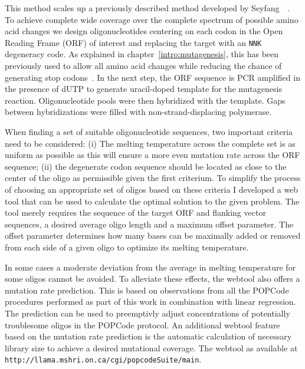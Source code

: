 This method scales up a previously described method developed by Seyfang~\etal~\cite{seyfang_multiple_2004}. To achieve complete wide coverage over the complete spectrum of possible amino acid changes we design oligonucleotides centering on each codon in the Open Reading Frame (ORF) of interest and replacing the target with an \texttt{NNK} degeneracy code. As explained in chapter~\ref{intro:mutagenesis}, this has been previously used to allow all amino acid changes while reducing the chance of generating stop codons~\cite{pal_methods_2005}. 
In the next step, the ORF sequence is PCR amplified in the presence of dUTP to generate uracil-doped template for the mutagenesis reaction. Oligonucleotide pools were then hybridized with the template. Gaps between hybridizations were filled with non-strand-displacing polymerase. 

When finding a set of suitable oligonucleotide sequences, two important criteria need to be considered: 
(i) The melting temperature across the complete set is as uniform as possible as this will ensure a more even mutation rate across the ORF sequence; (ii) the degenerate codon sequence should be located as close to the center of the oligo as permissible given the first criterium. To simplify the process of choosing an appropriate set of oligos based on these criteria I developed a web tool that can be used to calculate the optimal solution to the given problem. The tool merely requires the sequence of the target ORF and flanking vector sequences, a desired average oligo length and a maximum offset parameter. The offset parameter determines how many bases can be maximally added or removed from each side of a given oligo to optimize its melting temperature. 

In some cases a moderate deviation from the average in melting temperature for some oligos cannot be avoided. To alleviate these effects, the webtool also offers a mutation rate prediction. This is based on observations from all the POPCode procedures performed as part of this work in combination with linear regression. The prediction can be used to preemptivly adjust concentrations of potentially troublesome oligos in the POPCode protocol. An additional webtool feature based on the mutation rate prediction is the automatic calculation of necessary library size to achieve a desired mutational coverage. The webtool as available at \verb|http://llama.mshri.on.ca/cgi/popcodeSuite/main|.


